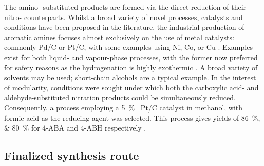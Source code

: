 The amino- substituted products are formed via the direct reduction of their nitro- counterparts.
Whilst a broad variety of novel processes, catalysts and conditions have been proposed in the literature, the industrial production of aromatic amines focuses almost exclusively on the use of metal catalysts: commonly Pd/C or Pt/C, with some examples using Ni, Co, or Cu \cite{vogt_amines_2000,cartolano_amines_2004}.
Examples exist for both liquid- and vapour-phase processes, with the former  now preferred for safety reasons as the hydrogenation is highly exothermic \cite{vogt_amines_2000}.
A broad variety of solvents may be used; short-chain alcohols are a typical example.
In the interest of modularity, conditions were sought under which both the carboxylic acid- and aldehyde-substituted nitration products could be simultaneously reduced.
Consequently, a process employing a \SI{5}{\percent\ww} Pt/C catalyst in methanol, with formic acid as the reducing agent was selected.
This process gives yields of \SIlist{86;80}{\percent} for 4-ABA and 4-ABH respectively \cite{gowda_catalytic_2000}.	

\subsection{Finalized synthesis route} %
 
	 
	

















 



	
	
	
